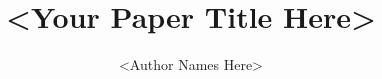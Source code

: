 \documentclass[a4paper,oneside,hyperref]{article}
\title{<Your Paper Title Here>}
\author{<Author Names Here>}
\date{} %
\begin{document}
\nobibliography{}             %
\makecoverpage                %
\end{document}

